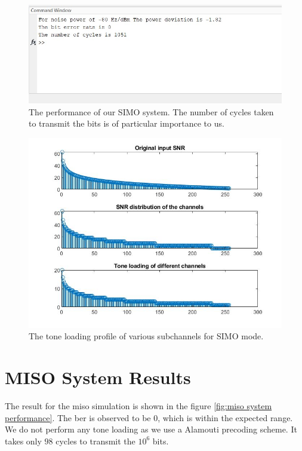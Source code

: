 \begin{figure}[!htbp]
\centering
\includegraphics[scale=1]{Chapter 4/Figures/SIMO System Performance}
\caption[SIMO Tone Loading]{The performance of our SIMO system. The number of cycles taken to transmit the bits is of particular importance to us.}
\label{fig:simo system performance}
\end{figure}

\begin{figure}[!htbp]
\centering
\includegraphics[scale=0.7]{Chapter 4/Figures/SIMO Tone Loading}
\caption[SIMO Tone Loading]{The tone loading profile of various subchannels for SIMO mode.}
\label{fig:simo tone loading}
\end{figure}

\section{MISO System Results}
The result for the \acrshort{miso} simulation is shown in the figure \ref{fig:miso system performance}. The \acrshort{ber} is observed to be $0$, which is within the expected range. We do not perform any tone loading as we use a Alamouti precoding scheme. It takes only $98$ cycles to transmit the $10^6$ bits.

